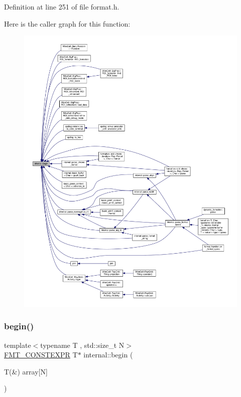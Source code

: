 Definition at line 251 of file format.\+h.

Here is the caller graph for this function\+:
\nopagebreak
\begin{figure}[H]
\begin{center}
\leavevmode
\includegraphics[width=350pt]{namespaceinternal_a265f36d9dee68d3f44381347ef2fd5cb_icgraph}
\end{center}
\end{figure}
\mbox{\label{namespaceinternal_a0567295d80d8401a11f91260284cd62e}} 
\subsubsection{\texorpdfstring{begin()}{begin()}\hspace{0.1cm}{\footnotesize\ttfamily [2/2]}}
{\footnotesize\ttfamily template$<$typename T , std\+::size\+\_\+t N$>$ \\
\hyperlink{core_8h_a69201cb276383873487bf68b4ef8b4cd}{F\+M\+T\+\_\+\+C\+O\+N\+S\+T\+E\+X\+PR} T$\ast$ internal\+::begin (\begin{DoxyParamCaption}\item[{T(\&)}]{array\mbox{[}\+N\mbox{]} }\end{DoxyParamCaption})}



